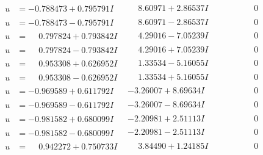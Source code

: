 \documentclass[1p]{elsarticle_modified}
\theoremstyle{definition}
\begin{document}
$$\begin{array}{c|c|c}
\begin{aligned}
u &= -0.788473 + 0.795791 I\end{aligned}
 & \phantom{-}8.60971 + 2.86537 I & \phantom{-0.000000 } 0 \\ \hline\begin{aligned}
u &= -0.788473 - 0.795791 I\end{aligned}
 & \phantom{-}8.60971 - 2.86537 I & \phantom{-0.000000 } 0 \\ \hline\begin{aligned}
u &= \phantom{-}0.797824 + 0.793842 I\end{aligned}
 & \phantom{-}4.29016 - 7.05239 I & \phantom{-0.000000 } 0 \\ \hline\begin{aligned}
u &= \phantom{-}0.797824 - 0.793842 I\end{aligned}
 & \phantom{-}4.29016 + 7.05239 I & \phantom{-0.000000 } 0 \\ \hline\begin{aligned}
u &= \phantom{-}0.953308 + 0.626952 I\end{aligned}
 & \phantom{-}1.33534 - 5.16055 I & \phantom{-0.000000 } 0 \\ \hline\begin{aligned}
u &= \phantom{-}0.953308 - 0.626952 I\end{aligned}
 & \phantom{-}1.33534 + 5.16055 I & \phantom{-0.000000 } 0 \\ \hline\begin{aligned}
u &= -0.969589 + 0.611792 I\end{aligned}
 & -3.26007 + 8.69634 I & \phantom{-0.000000 } 0 \\ \hline\begin{aligned}
u &= -0.969589 - 0.611792 I\end{aligned}
 & -3.26007 - 8.69634 I & \phantom{-0.000000 } 0 \\ \hline\begin{aligned}
u &= -0.981582 + 0.680099 I\end{aligned}
 & -2.20981 + 2.51113 I & \phantom{-0.000000 } 0 \\ \hline\begin{aligned}
u &= -0.981582 - 0.680099 I\end{aligned}
 & -2.20981 - 2.51113 I & \phantom{-0.000000 } 0 \\ \hline\begin{aligned}
u &= \phantom{-}0.942272 + 0.750733 I\end{aligned}
 & \phantom{-}3.84490 + 1.24185 I & \phantom{-0.000000 } 0 \\ \hline\begin{aligned}

\end{aligned}
\end{array}$$
\end{document}
